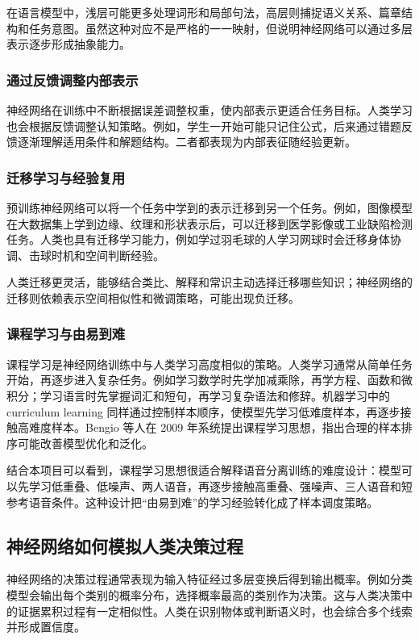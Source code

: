 \documentclass[UTF8,zihao=5,a4paper]{ctexart}
\begin{document}
在语言模型中，浅层可能更多处理词形和局部句法，高层则捕捉语义关系、篇章结构和任务意图。虽然这种对应不是严格的一一映射，但说明神经网络可以通过多层表示逐步形成抽象能力。

\subsubsection{通过反馈调整内部表示}

神经网络在训练中不断根据误差调整权重，使内部表示更适合任务目标。人类学习也会根据反馈调整认知策略。例如，学生一开始可能只记住公式，后来通过错题反馈逐渐理解适用条件和解题结构。二者都表现为内部表征随经验更新。

\subsubsection{迁移学习与经验复用}

预训练神经网络可以将一个任务中学到的表示迁移到另一个任务。例如，图像模型在大数据集上学到边缘、纹理和形状表示后，可以迁移到医学影像或工业缺陷检测任务。人类也具有迁移学习能力，例如学过羽毛球的人学习网球时会迁移身体协调、击球时机和空间判断经验。

人类迁移更灵活，能够结合类比、解释和常识主动选择迁移哪些知识；神经网络的迁移则依赖表示空间相似性和微调策略，可能出现负迁移。

\subsubsection{课程学习与由易到难}

课程学习是神经网络训练中与人类学习高度相似的策略。人类学习通常从简单任务开始，再逐步进入复杂任务。例如学习数学时先学加减乘除，再学方程、函数和微积分；学习语言时先掌握词汇和短句，再学习复杂语法和修辞。机器学习中的 curriculum learning 同样通过控制样本顺序，使模型先学习低难度样本，再逐步接触高难度样本。Bengio 等人在 2009 年系统提出课程学习思想，指出合理的样本排序可能改善模型优化和泛化\cite{bengio2009curriculum}。

结合本项目可以看到，课程学习思想很适合解释语音分离训练的难度设计：模型可以先学习低重叠、低噪声、两人语音，再逐步接触高重叠、强噪声、三人语音和短参考语音条件。这种设计把“由易到难”的学习经验转化成了样本调度策略。

\subsection{神经网络如何模拟人类决策过程}

神经网络的决策过程通常表现为输入特征经过多层变换后得到输出概率。例如分类模型会输出每个类别的概率分布，选择概率最高的类别作为决策。这与人类决策中的证据累积过程有一定相似性。人类在识别物体或判断语义时，也会综合多个线索并形成置信度。
\end{document}
